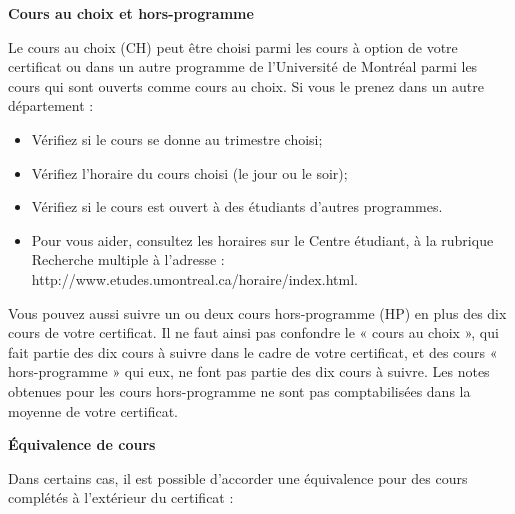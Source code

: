 \documentclass [12 pt]{article}
\begin{document}
            
        \textbf{
        Cours au choix et hors-programme
        }
    
            Le cours au choix (CH) peut être choisi parmi les cours à option de votre certificat
                ou dans un autre programme de l'Université de Montréal parmi les cours qui sont
                ouverts comme cours au choix.
            Si vous le prenez dans un autre département :
            
        \begin{itemize}
        
                
        \item Vérifiez si le cours se donne au trimestre choisi;
                
        \item Vérifiez l'horaire du cours choisi (le jour ou le soir);
                
        \item Vérifiez si le cours est ouvert à des étudiants d'autres programmes.
                
        \item Pour vous aider, consultez les horaires sur le Centre étudiant, à la rubrique
                    Recherche multiple à l'adresse : http://www.etudes.umontreal.ca/horaire/index.html.
            
        \end{itemize}
    
            Vous pouvez aussi suivre un ou deux cours hors-programme (HP) en plus des dix cours
                de votre certificat. Il ne faut ainsi pas confondre le « cours au choix », qui fait
                partie des dix cours à suivre dans le cadre de votre certificat, et des cours «
                hors-programme » qui eux, ne font pas partie des dix cours à suivre. Les notes
                obtenues pour les cours hors-programme ne sont pas comptabilisées dans la moyenne de
                votre certificat.
            
        \textbf{
        Équivalence de cours
        }
    
            Dans certains cas, il est possible d'accorder une équivalence pour des cours
                complétés à l'extérieur du certificat :
            
\end{document}
